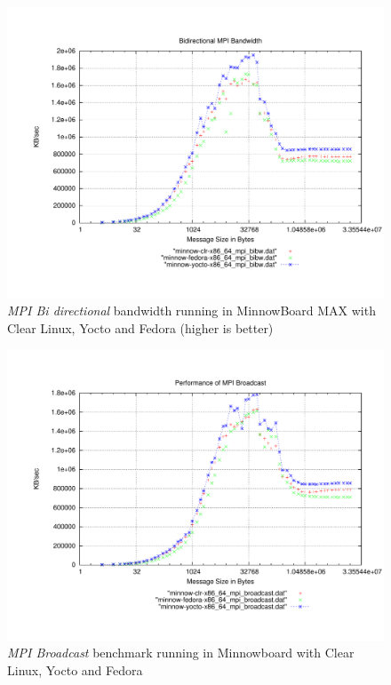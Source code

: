 \begin{figure}[H]
\centering
\includegraphics[width=1 \textwidth]{images/mpbench_yocto_experiments/mpi_bibw.pdf}
\caption{\textit{MPI Bi directional} bandwidth running in MinnowBoard MAX with Clear Linux,
Yocto and Fedora (higher is better)}
\label{mpi_bibw_yocto}
\end{figure}


\begin{figure}[H]
\centering
\includegraphics[width=1 \textwidth]{images/mpbench_yocto_experiments/mpi_broadcast.pdf}
\caption{\textit{MPI Broadcast} benchmark running in Minnowboard with Clear Linux, Yocto
and Fedora }
\label{mpi_broadcast_yocto}
\end{figure}

